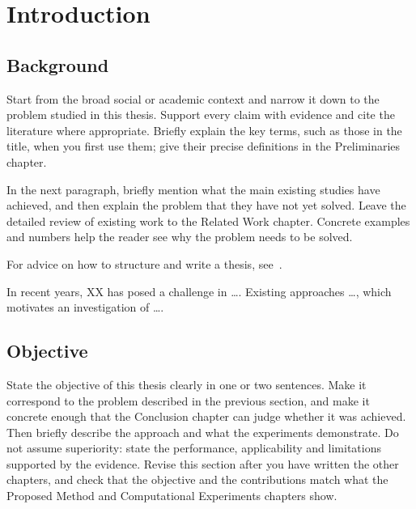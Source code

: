\chapter{Introduction}
\label{chap:introduction}

\section{Background}
\label{sec:background}

\begin{writingnote}
Start from the broad social or academic context and narrow it down to the problem studied in this thesis.
Support every claim with evidence and cite the literature where appropriate.
Briefly explain the key terms, such as those in the title, when you first use them;
give their precise definitions in the Preliminaries chapter.

In the next paragraph, briefly mention what the main existing studies have achieved,
and then explain the problem that they have not yet solved.
Leave the detailed review of existing work to the Related Work chapter.
Concrete examples and numbers help the reader see why the problem needs to be solved.

For advice on how to structure and write a thesis, see~\cite{zobel2014writing,glasmandeal2010science}.
\end{writingnote}

In recent years, XX has posed a challenge in \ldots.
Existing approaches \ldots, which motivates an investigation of \ldots.

\section{Objective}
\label{sec:objective}

\begin{writingnote}
State the objective of this thesis clearly in one or two sentences.
Make it correspond to the problem described in the previous section,
and make it concrete enough that the Conclusion chapter can judge whether it was achieved.
Then briefly describe the approach and what the experiments demonstrate.
Do not assume superiority: state the performance, applicability and limitations supported by the evidence.
Revise this section after you have written the other chapters, and check that the objective and the contributions
match what the Proposed Method and Computational Experiments chapters show.
\end{writingnote}

